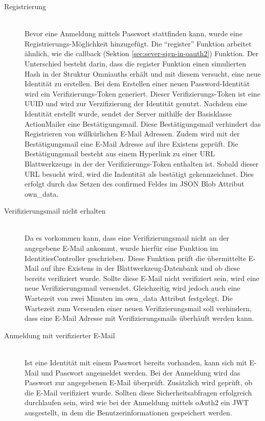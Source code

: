 \begin{description}
	\item[Registrierung]\hfill\\
	Bevor eine Anmeldung mittels Passwort stattfinden kann, wurde eine Registrierungs-Möglichkeit hinzugefügt. Die \enquote{register} Funktion arbeitet ähnlich, wie die callback (Sektion \ref{sec:sever-sign-in-oauth2}) Funktion. Der Unterschied besteht darin, dass die register Funktion einen simulierten Hash in der Struktur Omniauths erhält und mit diesem versucht, eine neue Identität zu erstellen. Bei dem Erstellen einer neuen Password-Identität wird ein Verifizierungs-Token generiert. Dieser Verifizierungs-Token ist eine \gls{UUID} und wird zur Verzifizierung der Identität genutzt. Nachdem eine Identität erstellt wurde, sendet der Server mithilfe der Basisklasse ActionMailer eine Bestätigungsmail. Diese Bestätigungsmail verhindert das Registrieren von willkürlichen E-Mail Adressen. Zudem wird  mit der Bestätigungsmail eine E-Mail Adresse auf ihre Existens geprüft. Die Bestätigungsmail besteht aus einem Hyperlink zu einer \gls{URL} Blattwerkzeugs in der der Verifizierungs-Token enthalten ist. Sobald dieser \gls{URL} besucht wird, wird die Indentität als bestätigt gekennzeichnet. Dies erfolgt durch das Setzen des confirmed Feldes im JSON Blob Attribut own\_data.

	\item[Verifizierungsmail nicht erhalten]\hfill\\
	Da es vorkommen kann, dass eine Verifizierungsmail nicht an der angegebene E-Mail ankommt, wurde hierfür eine Funktion im IdentitiesController geschrieben. Diese Funktion prüft die übermittelte E-Mail auf ihre Existens in der Blattwerkzeug-Datenbank und ob diese bereits verifiziert wurde. Sollte diese E-Mail nicht verifiziert sein, wird eine neue Verifizierungsmail versendet. Gleichzeitig wird jedoch auch eine Wartezeit von zwei Minuten im own\_data Attribut festgelegt. Die Wartezeit zum Versenden einer neuen Verifizierungsmail soll verhindern, dass eine E-Mail Adresse mit Verifizierungsmails überhäuft werden kann.

	\item[Anmeldung mit verifizierter E-Mail]\hfill\\
	Ist eine Identität mit einem Passwort bereits vorhanden, kann sich mit E-Mail und Passwort angemeldet werden. Bei der Anmeldung wird das Passwort zur angegebenen E-Mail überprüft. Zusätzlich wird geprüft, ob die E-Mail verifiziert wurde. Sollten diese Sicherheitsabfragen erfolgreich durchlaufen sein, wird wie bei der Anmeldung mittels \gls{oAuth2} ein \gls{JWT} ausgestellt, in dem die Benutzerinformationen gespeichert werden.


\end{description}
